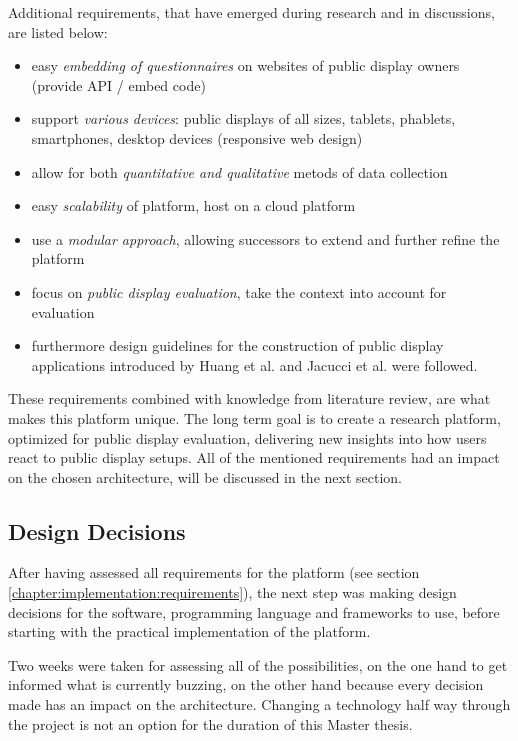 	Additional requirements, that have emerged during research and in discussions, are listed below:

	\begin{itemize}[itemsep=0pt] 
	\item easy \textit{embedding of questionnaires} on websites of public display owners (provide API / embed code)
	\item support \textit{various devices}: public displays of all sizes, tablets, phablets, smartphones, desktop devices (responsive web design)
	\item allow for both \textit{quantitative and qualitative} metods of data collection
	\item easy \textit{scalability} of platform, host on a cloud platform
	\item use a \textit{modular approach}, allowing successors to extend and further refine the platform
	\item focus on \textit{public display evaluation}, take the context into account for evaluation
	\item furthermore design guidelines for the construction of public display applications introduced by Huang et al. \cite{huang2008overcoming} and Jacucci et al. \cite{jacucci2010worldsofinformation} were followed.
	\end{itemize}

	These requirements combined with knowledge from literature review, are what makes this platform unique. The long term goal is to create a research platform, optimized for public display evaluation, delivering new insights into how users react to public display setups. All of the mentioned requirements had an impact on the chosen architecture, will be discussed in the next section.



\subsection{Design Decisions}
\label{chapter:implementation:design-decisions}

	After having assessed all requirements for the platform (see section \ref{chapter:implementation:requirements}), the next step was making design decisions for the software, programming language and frameworks to use, before starting with the practical implementation of the platform. 

	Two weeks were taken for assessing all of the possibilities, on the one hand to get informed what is currently buzzing, on the other hand because every decision made has an impact on the architecture. Changing a technology half way through the project is not an option for the duration of this Master thesis.


